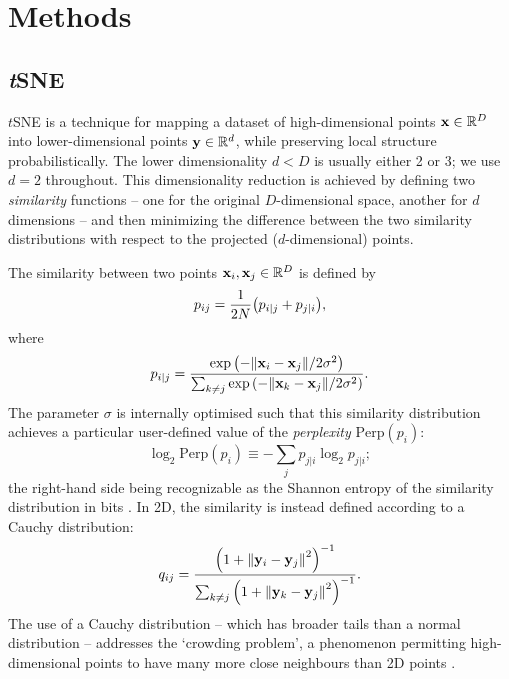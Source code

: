 \documentclass[fleqn,usenatbib]{rasti}
\newcommand\xb{\vb{x}}
\newcommand\yb{\vb{y}}
\begin{document}
\section{Methods} \label{sec:methods}

\subsection{\textit{t}SNE} \label{sec:tsne}

$t$SNE is a technique for mapping a dataset of high-dimensional points $\xb\in\mathbb{R}^D$ into lower-dimensional points $\yb\in\mathbb{R}^d$, while preserving local structure probabilistically.
The lower dimensionality $d<D$ is usually either 2 or 3; we use $d=2$ throughout.
This dimensionality reduction is achieved by defining two \textit{similarity} functions -- one for the original $D$-dimensional space, another for $d$ dimensions -- and then minimizing the difference between the two similarity distributions with respect to the projected ($d$-dimensional) points.

The similarity between two points $\xb_i, \xb_j \in \mathbb{R}^D$ is defined by
\begin{equation}
p_{ij} = \frac{1}{2N} \qty(p_{i|j} + p_{j|i}),
\end{equation}
where
\begin{equation}
p_{i|j} = \frac{
    \exp\qty(-\norm{\xb_i - \xb_j} / 2\sigma^2)
}{
    \sum_{k\neq j} \exp\qty(-\norm{\xb_k - \xb_j} / 2 \sigma^2)
}.
\end{equation}
The parameter $\sigma$ is internally optimised such that this similarity distribution achieves a particular user-defined value of the \textit{perplexity} $\mathrm{Perp}(p_i)$:
\begin{equation}
\log_2\mathrm{Perp}(p_i) \equiv
    -\sum_j p_{j|i} \log_2 p_{j|i};
\end{equation}
the right-hand side being recognizable as the Shannon entropy of the similarity distribution in bits \citep{vandermaaten08}.
In 2D, the similarity is instead defined according to a Cauchy distribution:
\begin{equation}
q_{ij} = \frac{
    \qty(1 + \norm{\yb_i - \yb_j}^2)^{-1}
}{
    \sum_{k\neq j} \qty(1 + \norm{\yb_k - \yb_j}^2)^{-1}
}.
\end{equation}
The use of a Cauchy distribution -- which has broader tails than a normal distribution -- addresses the `crowding problem', a phenomenon permitting high-dimensional points to have many more close neighbours than 2D points \citep{vandermaaten08}.
\end{document}
